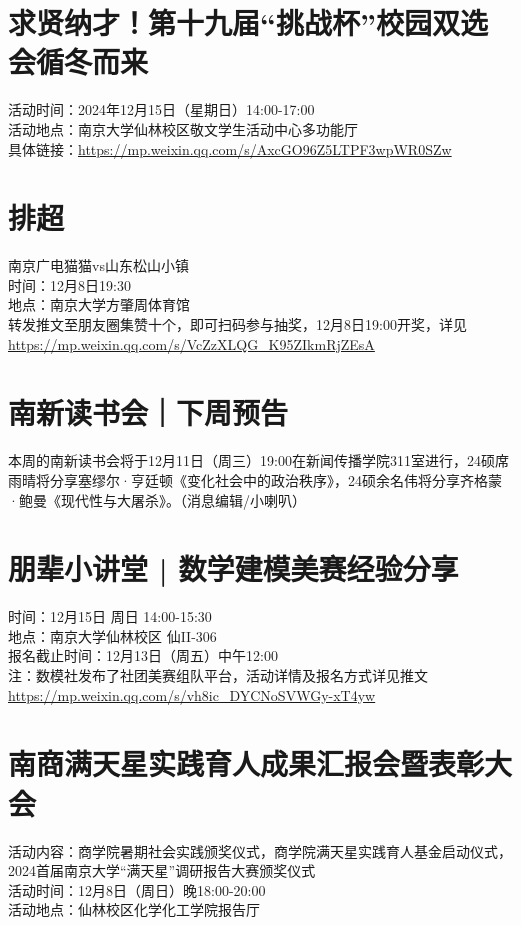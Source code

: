 \documentclass[letterpaper, 12pt]{article}
\begin{document}
\begin{multicols}{2}
\section{求贤纳才！第十九届“挑战杯”校园双选会循冬而来}
活动时间：2024年12月15日（星期日）14:00-17:00\\
活动地点：南京大学仙林校区敬文学生活动中心多功能厅\\
具体链接：\url{https://mp.weixin.qq.com/s/AxcGO96Z5LTPF3wpWR0SZw}\\

\section{排超}
南京广电猫猫vs山东松山小镇\\
时间：12月8日19:30\\
地点：南京大学方肇周体育馆\\
转发推文至朋友圈集赞十个，即可扫码参与抽奖，12月8日19:00开奖，详见\url{https://mp.weixin.qq.com/s/VcZzXLQG_K95ZIkmRjZEsA}

\section{南新读书会｜下周预告}
本周的南新读书会将于12月11日（周三）19:00在新闻传播学院311室进行，24硕席雨晴将分享塞缪尔·亨廷顿《变化社会中的政治秩序》，24硕余名伟将分享齐格蒙·鲍曼《现代性与大屠杀》。（消息编辑/小喇叭）

\section{朋辈小讲堂 | 数学建模美赛经验分享}
时间：12月15日 周日 14:00-15:30\\
地点：南京大学仙林校区 仙II-306\\
报名截止时间：12月13日（周五）中午12:00\\
注：数模社发布了社团美赛组队平台，活动详情及报名方式详见推文\url{https://mp.weixin.qq.com/s/vh8ic_DYCNoSVWGy-xT4yw}

\section{南商满天星实践育人成果汇报会暨表彰大会}
活动内容：商学院暑期社会实践颁奖仪式，商学院满天星实践育人基金启动仪式，2024首届南京大学“满天星”调研报告大赛颁奖仪式\\
活动时间：12月8日（周日）晚18:00-20:00\\
活动地点：仙林校区化学化工学院报告厅\\


\end{multicols}
\end{document}
